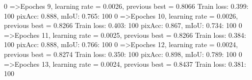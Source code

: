   0%
=>Epoches 9, learning rate = 0.0026,                 previous best = 0.8066
Train loss: 0.399: 100%
pixAcc: 0.888, mIoU: 0.765: 100%
  0%
=>Epoches 10, learning rate = 0.0026,                 previous best = 0.8266
Train loss: 0.403: 100%
pixAcc: 0.867, mIoU: 0.734: 100%
  0%
=>Epoches 11, learning rate = 0.0025,                 previous best = 0.8266
Train loss: 0.384: 100%
pixAcc: 0.888, mIoU: 0.766: 100%
  0%
=>Epoches 12, learning rate = 0.0024,                 previous best = 0.8274
Train loss: 0.350: 100%
pixAcc: 0.898, mIoU: 0.789: 100%
  0%
=>Epoches 13, learning rate = 0.0024,                 previous best = 0.8437
Train loss: 0.381: 100%
